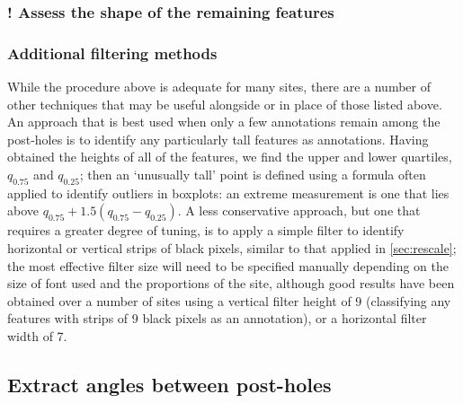 \documentclass[../../ArchStats.tex]{subfiles}
\begin{document}

\subsubsection{! Assess the shape of the remaining features}




\subsubsection{Additional filtering methods}
\label{sec:alternative-techniques}

While the procedure above is adequate for many sites, there are a number of other techniques that may be useful alongside or in place of those listed above. An approach that is best used when only a few annotations remain among the post-holes is to identify any particularly tall features as annotations. Having obtained the heights of all of the features, we find the upper and lower quartiles, $q_{0.75}$ and $q_{0.25}$; then an `unusually tall' point is defined using a formula often applied to identify outliers in boxplots: an extreme measurement is one that lies above $q_{0.75} + 1.5(q_{0.75} - q_{0.25})$. A less conservative approach, but one that requires a greater degree of tuning, is to apply a simple filter to identify horizontal or vertical strips of black pixels, similar to that applied in \ref{sec:rescale}; the most effective filter size will need to be specified manually depending on the size of font used and the proportions of the site, although good results have been obtained over a number of sites using a vertical filter height of 9 (classifying any features with strips of 9 black pixels as an annotation), or a horizontal filter width of 7.


\subsection{Extract angles between post-holes}
\label{sec:posts-to-angles}
\end{document}
